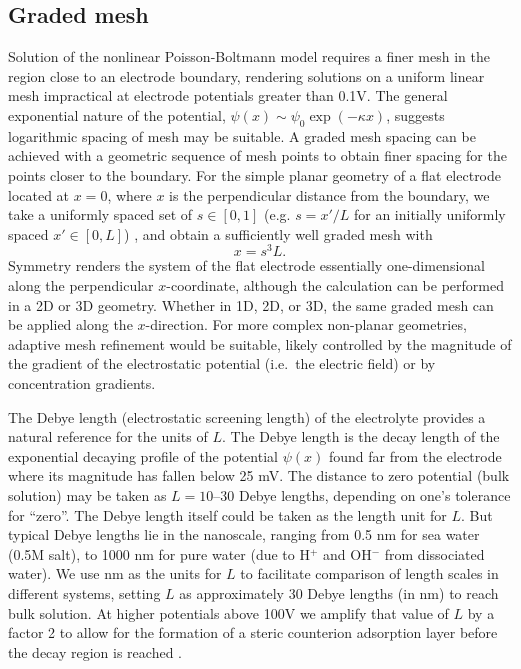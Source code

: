 \subsection{Graded mesh}
Solution of the nonlinear Poisson-Boltmann model requires a finer mesh in the  region
close to an electrode boundary, rendering solutions on a uniform linear mesh  impractical at electrode
potentials greater than 0.1V.  The general exponential nature of the potential,
$\psi(x) \sim \psi_{0} \exp(-\kappa x)$, suggests logarithmic spacing of
mesh may be suitable.
A graded mesh spacing can be achieved with a geometric sequence of
mesh points  to obtain finer spacing for the points closer to the boundary.
For the simple planar geometry of a flat electrode located at $x=0$,
where $x$ is the perpendicular distance from the boundary,
we take a uniformly spaced set of $s \in [0,1]$  (e.g. $s=x'/L$ for an
initially uniformly spaced $x'\in [0,L]$) , and obtain a sufficiently
well graded mesh with
\begin{equation}
  x = s^3 L.
\end{equation}
Symmetry renders the system of the flat electrode essentially one-dimensional along the
perpendicular $x$-coordinate, although the calculation can be performed in a 2D
or 3D geometry. Whether in 1D, 2D, or 3D, the same graded mesh can be
applied  along the  $x$-direction.
For more complex non-planar geometries, adaptive mesh refinement would
be suitable, likely controlled by the magnitude of the gradient of the
electrostatic potential (i.e.\ the electric field) or by concentration
gradients.

The Debye length (electrostatic screening length) of the electrolyte
provides a natural reference for the units of $L$. The Debye length is
the  decay length of the exponential decaying profile of the potential $\psi(x)$
found far from the electrode where its magnitude has fallen below 25
mV. The distance to zero potential (bulk solution) may be taken as
$L=10$--30 Debye lengths, depending on one's tolerance for
``zero''. The Debye length itself could be taken as the length unit
for $L$. But typical Debye lengths lie in the nanoscale, ranging from 0.5 nm for
sea water (0.5M salt), to 1000 nm for pure water (due to {H}$^{+}$ and
{OH}$^{-}$ from dissociated water). We use nm as the units for $L$ to facilitate
comparison of length scales in different systems, setting $L$ as
approximately 30 Debye lengths (in nm) to reach bulk solution. At
higher potentials above
100V we amplify that value of $L$ by a factor 2 to allow for the formation of a steric counterion adsorption
layer before the decay region is reached \cite{DagmawiParsons2022}.

